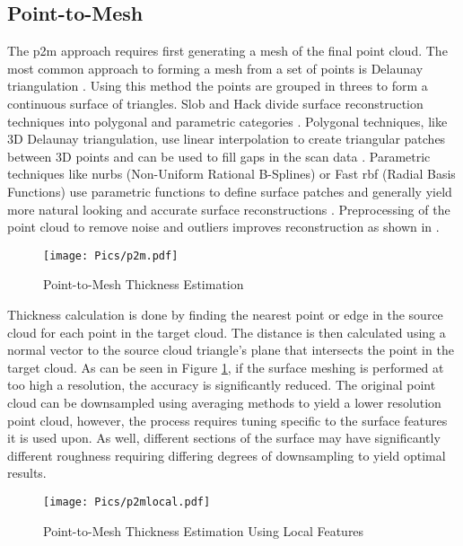 \subsection{Point-to-Mesh}

The \acrshort{p2m} approach requires first generating a mesh of the final point cloud. The most common approach to forming a mesh from a set of points is Delaunay triangulation \cite{delaunay}. Using this method the points are grouped in threes to form a continuous surface of triangles. Slob and Hack divide surface reconstruction techniques into polygonal and parametric categories \cite{mesh1}. Polygonal techniques, like 3D Delaunay triangulation, use linear interpolation to create triangular patches between 3D points and can be used to fill gaps in the scan data \cite{mesh3}. Parametric techniques like \acrshort{nurbs} (Non-Uniform Rational B-Splines) or Fast \acrshort{rbf} (Radial Basis Functions) use parametric functions to define surface patches and generally yield more natural looking and accurate surface reconstructions \cite{mesh1}. Preprocessing of the point cloud to remove noise and outliers improves reconstruction as shown in \cite{mesh2}.\\
\label{sec:p2m}
\begin{figure}[h!]
    \centering
    \texttt{[image: Pics/p2m.pdf]}
    \caption{Point-to-Mesh Thickness Estimation}
    \label{fig:p2mdia}
\end{figure}

Thickness calculation is done by finding the nearest point or edge in the source cloud for each point in the target cloud. The distance is then calculated using a normal vector to the source cloud triangle's plane that intersects the point in the target cloud. As can be seen in Figure \ref{fig:p2mdia}, if the surface meshing is performed at too high a resolution, the accuracy is significantly reduced. The original point cloud can be downsampled using averaging methods to yield a lower resolution point cloud, however, the process requires tuning specific to the surface features it is used upon. As well, different sections of the surface may have significantly different roughness requiring differing degrees of downsampling to yield optimal results.\\
\begin{figure}[h!]
    \centering
    \texttt{[image: Pics/p2mlocal.pdf]}
    \caption{Point-to-Mesh Thickness Estimation Using Local Features}
    \label{fig:p2mlocaldia}
\end{figure}

